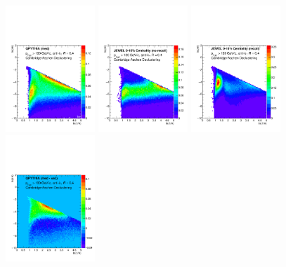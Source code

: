 \begin{figure}[h]
\centering
\includegraphics[width=0.3\textwidth]{figures/LundMC/QPythia_Med2}
\includegraphics[width=0.3\textwidth]{figures/LundMC/Jewel_Med}
\includegraphics[width=0.3\textwidth]{figures/LundMC/Jewel_MedRecoil}
\includegraphics[width=0.3\textwidth]{figures/LundMC/QPythia_Diff}

\end{figure}
